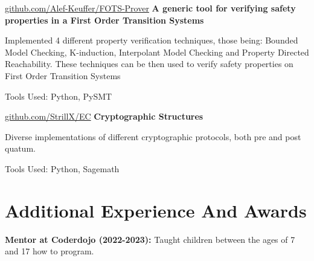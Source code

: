 \documentclass[10pt, letterpaper]{article}
\begin{document}
        
        \begin{twocolentry}{
            \href{https://github.com/Alef-Keuffer/FOTS-Prover}{github.com/Alef-Keuffer/FOTS-Prover}
        }
            \textbf{A generic tool for verifying safety properties in a First Order Transition Systems}\end{twocolentry}

        \vspace{0.10 cm}
        \begin{onecolentry}
            \begin{highlights}
                \item Implemented 4 different property verification techniques, those being: Bounded Model Checking, K-induction, Interpolant Model Checking and Property Directed Reachability. These techniques can be then used to verify safety properties on First Order Transition Systems
                \item Tools Used: Python, PySMT
            \end{highlights}
        \end{onecolentry}


        \vspace{0.2 cm}

        \begin{twocolentry}{
            \href{https://github.com/StrillX/EC}{github.com/StrillX/EC}
        }
            \textbf{Cryptographic Structures}\end{twocolentry}

        \vspace{0.10 cm}
        \begin{onecolentry}
            \begin{highlights}
                \item Diverse implementations of different cryptographic protocols, both pre and post quatum.
                \item Tools Used: Python, Sagemath
            \end{highlights}
        \end{onecolentry}


    
    \section{Additional Experience And Awards}



        
        \begin{onecolentry}
            \textbf{Mentor at Coderdojo (2022-2023):} Taught children between the ages of 7 and 17 how to program.
        \end{onecolentry}
    
\end{document}
